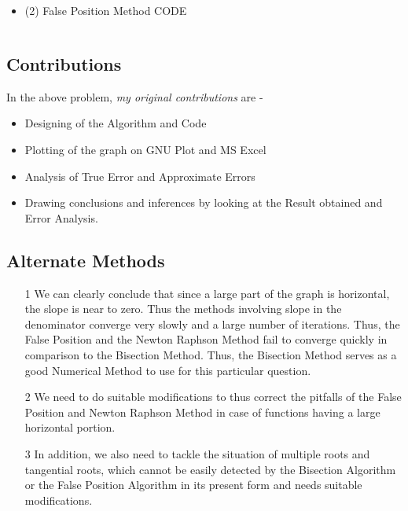\documentclass[titlepage, 11pt]{article}
\begin{document}
\begin {itemize}
\item [(2)] False Position Method CODE
\end {itemize}
\inputminted[breaklines,
 mathescape,
 linenos,
 numbersep=5pt,
 frame=single,
 numbersep=5pt,
 xleftmargin=0pt]{c}{FalsePosition2.c}
\label{listing:9}


\subsection{Contributions}
In the above problem, \textit{my original contributions} are - 
\begin{itemize}
    \item Designing of the Algorithm and Code
    \item Plotting of the graph on GNU Plot and MS Excel
    \item Analysis of True Error and Approximate Errors
    \item Drawing conclusions and inferences by looking at the Result obtained and Error Analysis.
\end{itemize}



\subsection{Alternate Methods}
\begin{itemize}
\item [1] We can clearly conclude that since a large part of the graph is horizontal, the slope is near to zero. Thus the methods involving slope in the denominator converge very slowly and a large number of iterations. Thus, the False Position and the Newton Raphson Method fail to converge quickly in comparison to the Bisection Method. Thus, the Bisection Method serves as a good Numerical Method to use for this particular question. \\
\item [2] We need to do suitable modifications to thus correct the pitfalls of the False Position and Newton Raphson Method in case of functions having a large horizontal portion. \\
\item [3] In addition, we also need to tackle the situation of multiple roots and tangential roots, which cannot be easily detected by the Bisection Algorithm or the False Position Algorithm in its present form and needs suitable modifications. \\
\end{itemize}
\end{document}
